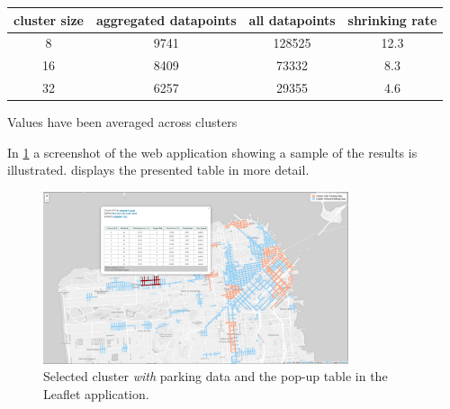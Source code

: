 \documentclass{ws-ijait}
\begin{document}
		\begin{table}[!ht]
			{\begin{tabular}{ | c | c | c | c | } %
					\hline
					{cluster size} & {aggregated datapoints} & {all datapoints} & {shrinking rate} \\ \hline
					8 &	9741 & 128525 &	12.3 \\ \hline
					16 & 8409 &	73332 &	8.3 \\ \hline
					32 & 6257 &	29355 &	4.6 \\ \hline
			\end{tabular}}
			\begin{tabnote}
				Values have been averaged across clusters
			\end{tabnote}
			\label{tab:models_training_points}
		\end{table}
		
		In \cref{fig:cwith} a screenshot of the web application showing a sample of the results is illustrated.  displays the presented table in more detail.
		
		\begin{figure}[!ht]
			\centering
			\includegraphics[width=0.8\textwidth]{../graphics/cwith_source_dt_cosine.png}
			\caption{Selected cluster \textit{with} parking data and the pop-up table in the Leaflet application.}
			\label{fig:cwith}
		\end{figure}
		
\end{document}
